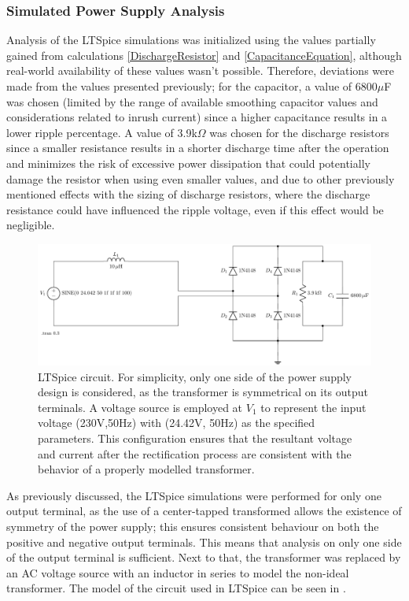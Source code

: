 \subsubsection{Simulated Power Supply Analysis}
Analysis of the LTSpice simulations was initialized using the values partially gained from calculations \ref{DischargeResistor} and \ref{CapacitanceEquation}, although real-world availability of these values wasn't possible. Therefore, deviations were made from the values presented previously; for the capacitor, a value of 6800$\mu$F was chosen (limited by the range of available smoothing capacitor values and considerations related to inrush current) since a higher capacitance results in a lower ripple percentage. A value of 3.9k$\Omega$ was chosen for the discharge resistors since a smaller resistance results in a shorter discharge time after the operation and minimizes the risk of excessive power dissipation that could potentially damage the resistor when using even smaller values, and due to other previously mentioned effects with the sizing of discharge resistors, where the discharge resistance could have influenced the ripple voltage, even if this effect would be negligible.
\begin{figure}[H]
    \centering
    \captionsetup{justification=raggedright, labelfont=bf}
    \includegraphics[width=0.8\linewidth]{TU Delft Booming Bass Project Report/figures/PowerSupply/MainPowerSupplyLTSPice.pdf}
    \caption{{LTSpice circuit. For simplicity, only one side of the power supply design is considered, as the transformer is symmetrical on its output terminals. A voltage source is employed at $V_1$ to represent the input voltage (230V,50Hz) with (24.42V, 50Hz) as the specified parameters. This configuration ensures that the resultant voltage and current after the rectification process are consistent with the behavior of a properly modelled transformer.}}
    \label{fig:MainPowerSupplySchematicLTSpice}
\end{figure}

As previously discussed, the LTSpice simulations were performed for only one output terminal, as the use of a center-tapped transformed allows the existence of symmetry of the power supply; this ensures consistent behaviour on both the positive and negative output terminals. This means that analysis on only one side of the output terminal is sufficient. Next to that, the transformer was replaced by an AC voltage source with an inductor in series to model the non-ideal transformer. The model of the circuit used in LTSpice can be seen in .

